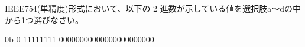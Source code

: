 IEEE754(単精度)形式において、以下の 2 進数が示している値を選択肢a〜dの中から1つ選びなさい。

\bigskip
\begin{center}
0b 0 11111111 00000000000000000000000
\end{center}
